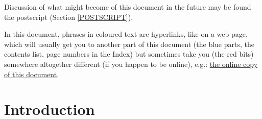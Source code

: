 \documentclass[11pt]{article}
\begin{document}
Discussion of what might become of this document in the future may be found the postscript (Section \ref{POSTSCRIPT}).

In this document, phrases in coloured text are hyperlinks, like on a web page, which will usually get you to another part of this document (the blue parts, the contents list, page numbers in the Index) but sometimes take you (the red bits) somewhere altogether different (if you happen to be online), e.g.: \href{http://rbjones.com/rbjpub/pp/doc/t041.pdf}{the online copy of this document}.

\cite{rbjt000}

\section{Introduction}
\end{document}
